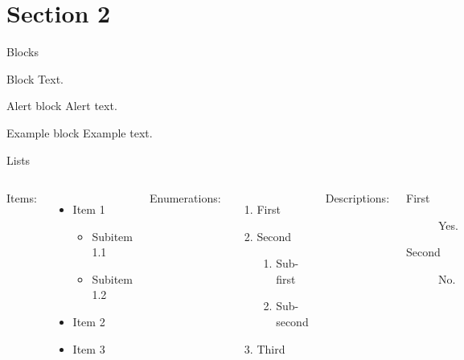 \documentclass{beamer}
\begin{document}
    \section{Section 2}
    \begin{frame}{Blocks}
        \begin{block}{Block}
            Text.
        \end{block}
        \pause
        \begin{alertblock}{Alert block}
            Alert \alert{text}.
        \end{alertblock}
        \pause
        \begin{exampleblock}{Example block}
            Example \textcolor{example}{text}.
        \end{exampleblock}
    \end{frame}
    
    \begin{frame}{Lists}
        \begin{columns}[t, onlytextwidth]
                Items:
                \begin{itemize}
                    \item Item 1
                    \begin{itemize}
                        \item Subitem 1.1
                        \item Subitem 1.2
                    \end{itemize}
                    \item Item 2
                    \item Item 3
                \end{itemize}
            
                Enumerations:
                \begin{enumerate}
                    \item First
                    \item Second
                    \begin{enumerate}
                        \item Sub-first
                        \item Sub-second
                    \end{enumerate}
                    \item Third
                \end{enumerate}
            
                Descriptions:
                \begin{description}
                    \item[First] Yes.
                    \item[Second] No.
                \end{description}
        \end{columns}
    \end{frame}
\end{document}
